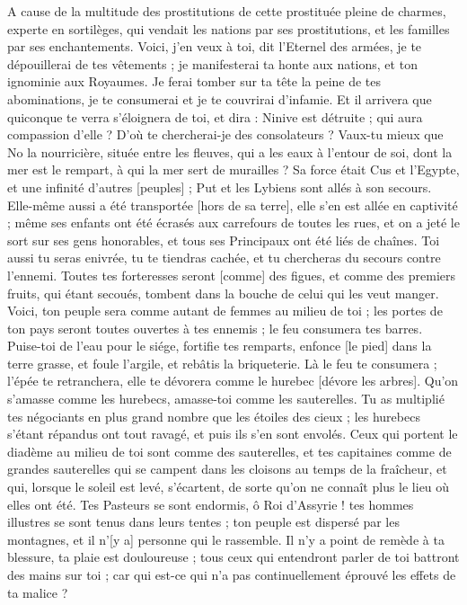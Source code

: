 \begin{multicols}{2}
A cause de la multitude des prostitutions de cette prostituée pleine de charmes, experte en sortilèges, qui vendait les nations par ses prostitutions, et les familles par ses enchantements.
Voici, j'en veux à toi, dit l'Eternel des armées, je te dépouillerai de tes vêtements ; je manifesterai ta honte aux nations, et ton ignominie aux Royaumes.
Je ferai tomber sur ta tête la peine de tes abominations, je te consumerai et je te couvrirai d'infamie.
Et il arrivera que quiconque te verra s'éloignera de toi, et dira : Ninive est détruite ; qui aura compassion d'elle ? D'où te chercherai-je des consolateurs ?
Vaux-tu mieux que No la nourricière, située entre les fleuves, qui a les eaux à l'entour de soi, dont la mer est le rempart, à qui la mer sert de murailles ?
Sa force était Cus et l'Egypte, et une infinité d'autres [peuples] ; Put et les Lybiens sont allés à son secours.
Elle-même aussi a été transportée [hors de sa terre], elle s'en est allée en captivité ; même ses enfants ont été écrasés aux carrefours de toutes les rues, et on a jeté le sort sur ses gens honorables, et tous ses Principaux ont été liés de chaînes.
Toi aussi tu seras enivrée, tu te tiendras cachée, et tu chercheras du secours contre l'ennemi.
Toutes tes forteresses seront [comme] des figues, et comme des premiers fruits, qui étant secoués, tombent dans la bouche de celui qui les veut manger.
Voici, ton peuple sera comme autant de femmes au milieu de toi ; les portes de ton pays seront toutes ouvertes à tes ennemis ; le feu consumera tes barres.
Puise-toi de l'eau pour le siége, fortifie tes remparts, enfonce [le pied] dans la terre grasse, et foule l'argile, et rebâtis la briqueterie.
Là le feu te consumera ; l'épée te retranchera, elle te dévorera comme le hurebec [dévore les arbres]. Qu'on s'amasse comme les hurebecs, amasse-toi comme les sauterelles.
Tu as multiplié tes négociants en plus grand nombre que les étoiles des cieux ; les hurebecs s'étant répandus ont tout ravagé, et puis ils s'en sont envolés.
Ceux qui portent le diadème au milieu de toi sont comme des sauterelles, et tes capitaines comme de grandes sauterelles qui se campent dans les cloisons au temps de la fraîcheur, et qui, lorsque le soleil est levé, s'écartent, de sorte qu'on ne connaît plus le lieu où elles ont été.
Tes Pasteurs se sont endormis, ô Roi d'Assyrie ! tes hommes illustres se sont tenus dans leurs tentes ; ton peuple est dispersé par les montagnes, et il n'[y a] personne qui le rassemble.
Il n'y a point de remède à ta blessure, ta plaie est douloureuse ; tous ceux qui entendront parler de toi battront des mains sur toi ; car qui est-ce qui n'a pas continuellement éprouvé les effets de ta malice ?
\PPE{}
\end{multicols}
